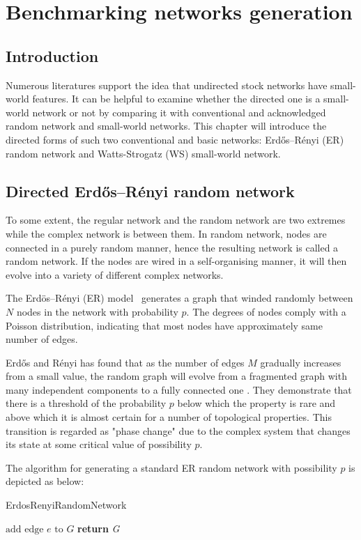 \chapter{Benchmarking networks generation}
\section{Introduction}
Numerous literatures support the idea that undirected stock networks have small-world features. It can be helpful to examine whether the directed one is a small-world network or not by comparing it with conventional and acknowledged random network and small-world networks. This chapter will introduce the directed forms of such two conventional and basic networks: Erdős–Rényi (ER) random network and Watts-Strogatz (WS) small-world network.

\section{Directed Erdős–Rényi random network}
To some extent, the regular network and the random network are two extremes while the complex network is between them. In random network, nodes are connected in a purely random manner, hence the resulting network is called a random network. If the nodes are wired in a self-organising manner, it will then evolve into a variety of different complex networks.

The Erdös–Rényi (ER) model~\cite{random} generates a graph that winded randomly between $N$ nodes in the network with probability $p$. The degrees of nodes comply with a Poisson distribution, indicating that most nodes have approximately same number of edges.

Erdős and Rényi has found that as the number of edges $M$ gradually increases from a small value, the random graph will evolve from a fragmented graph with many independent components to a fully connected one \cite{strogatz2001exploring}. They demonstrate that there is a threshold of the probability $p$ below which the property is rare and above which it is almost certain for a number of topological properties. This transition is regarded as "phase change" due to the complex system that changes its state at some critical value of possibility $p$.

The algorithm for generating a standard ER random network with possibility $p$ is depicted as below:

\begin{algorithm}[H]
	\caption{ErdosRenyiRandomNetwork}\label{alg:random}
	\begin{algorithmic}[1]
		 {$\text{add edge }\textit{e}\text{ to }\textit{G}$}
		\EndIf
		\EndFor
		\State \textbf{return} {\textit{G}}
		\EndProcedure
	\end{algorithmic}
\end{algorithm}

